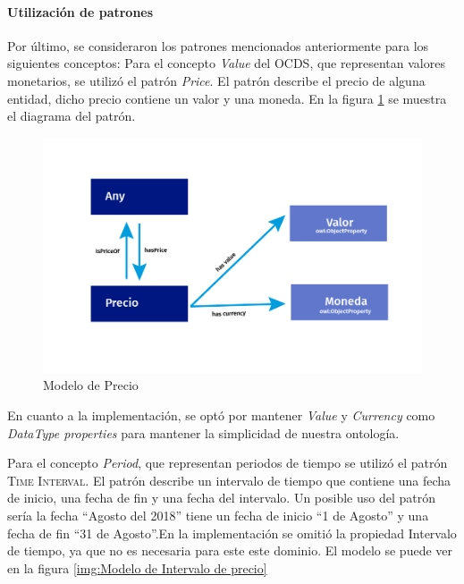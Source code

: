 \paragraph{Utilización de patrones}\hfill \break
Por último, se consideraron los patrones mencionados anteriormente para los siguientes conceptos:
Para el concepto \textit{Value} del OCDS, que representan valores monetarios, se utilizó el patrón \textit{Price}. El patrón describe el precio de alguna entidad, dicho precio contiene un valor y una moneda. En la figura \ref{img:Modelo de Precio} se muestra el diagrama del patrón.

\begin{figure}[ht!]
    \centering
    \includegraphics[width=150mm]{figuras/Diagramas_Precio.png}
    \caption{Modelo de Precio}
    \label{img:Modelo de Precio}
    
\end{figure}

En cuanto a la implementación, se optó por mantener \textit{Value} y \textit{Currency} como \textit{DataType properties} para mantener la simplicidad de nuestra ontología.

Para el concepto \textit{Period}, que representan periodos de tiempo se utilizó el patrón \textsc{Time Interval}. El patrón describe un intervalo de tiempo que contiene una fecha de inicio, una fecha de fin y una fecha del intervalo. Un posible uso del patrón sería la fecha “Agosto del 2018” tiene un fecha de inicio “1 de Agosto” y una fecha de fin “31 de Agosto”.En la implementación se omitió la propiedad Intervalo de tiempo, ya que no es necesaria para este este dominio. El modelo se puede ver en la figura \ref{img:Modelo de Intervalo de precio}

